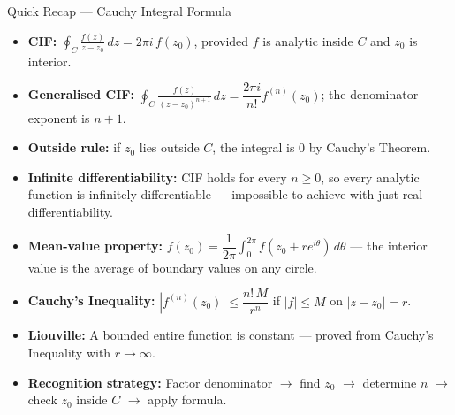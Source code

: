 \documentclass[12pt,a4paper]{article}
\begin{document}
\begin{learnbox}{Quick Recap --- Cauchy Integral Formula}
\begin{itemize}[noitemsep]
  \item \textbf{CIF:} $\displaystyle\oint_C\frac{f(z)}{z-z_0}\,dz = 2\pi i\,f(z_0)$, provided $f$ is analytic inside $C$ and $z_0$ is interior.
  \item \textbf{Generalised CIF:} $\displaystyle\oint_C\frac{f(z)}{(z-z_0)^{n+1}}\,dz = \dfrac{2\pi i}{n!}f^{(n)}(z_0)$; the denominator exponent is $n+1$.
  \item \textbf{Outside rule:} if $z_0$ lies outside $C$, the integral is $0$ by Cauchy's Theorem.
  \item \textbf{Infinite differentiability:} CIF holds for every $n\geq 0$, so every analytic function is infinitely differentiable --- impossible to achieve with just real differentiability.
  \item \textbf{Mean-value property:} $f(z_0) = \dfrac{1}{2\pi}\displaystyle\int_0^{2\pi}f(z_0 + re^{i\theta})\,d\theta$ --- the interior value is the average of boundary values on any circle.
  \item \textbf{Cauchy's Inequality:} $|f^{(n)}(z_0)| \leq \dfrac{n!\,M}{r^n}$ if $|f|\leq M$ on $|z-z_0|=r$.
  \item \textbf{Liouville:} A bounded entire function is constant --- proved from Cauchy's Inequality with $r\to\infty$.
  \item \textbf{Recognition strategy:} Factor denominator $\to$ find $z_0$ $\to$ determine $n$ $\to$ check $z_0$ inside $C$ $\to$ apply formula.
\end{itemize}
\end{learnbox}
\end{document}
